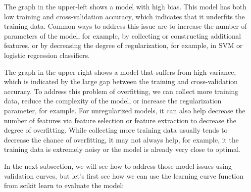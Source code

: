 \documentclass[11pt]{article}
\begin{document}
The graph in the upper-left shows a model with high bias. This model has
both low training and cross-validation accuracy, which indicates that it
underfits the training data. Common ways to address this issue are to
increase the number of parameters of the model, for example, by
collecting or constructing additional features, or by decreasing the
degree of regularization, for example, in SVM or logistic regression
classifiers.

The graph in the upper-right shows a model that suffers from high
variance, which is indicated by the large gap between the training and
cross-validation accuracy. To address this problem of overfitting, we
can collect more training data, reduce the complexity of the model, or
increase the regularization parameter, for example. For unregularized
models, it can also help decrease the number of features via feature
selection or feature extraction to decrease the degree of overfitting.
While collecting more training data usually tends to decrease the chance
of overfitting, it may not always help, for example, it the training
data is extremely noisy or the model is already very close to optimal.

In the next subsection, we will see how to address those model issues
using validation curves, but let's first see how we can use the learning
curve function from scikit learn to evaluate the model:
\end{document}
